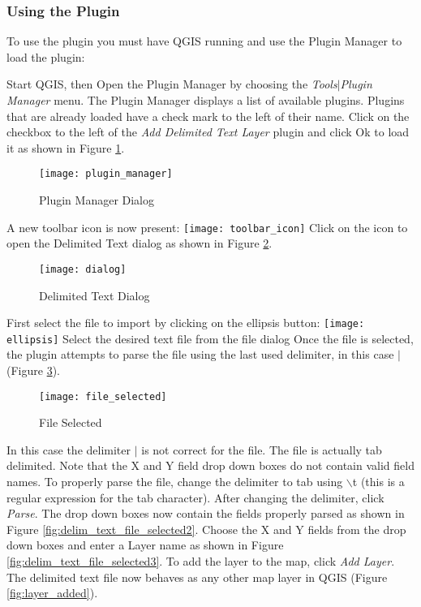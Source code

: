 \subsubsection{Using the Plugin}
To use the plugin you must have QGIS running and use the Plugin Manager to
load the plugin:

Start QGIS, then Open the Plugin Manager by choosing the {\em
Tools\mbox{$|$}Plugin Manager} menu. The Plugin Manager displays a list of
available plugins. Plugins that are already loaded have a check mark to the
left of their name. Click on the checkbox to the left of the {\em Add
Delimited Text Layer} plugin and click Ok to load it as shown in Figure
\ref{fig:plugin_manager}.

\begin{figure}[ht]
   \begin{center}
   \caption{Plugin Manager Dialog}
   \label{fig:plugin_manager}
   \smallskip
\texttt{[image: plugin\_manager]}
   \end{center}  
\end{figure}


A new toolbar icon is now present:
\texttt{[image: toolbar\_icon]}
Click on the icon to open the Delimited Text dialog as shown in Figure
\ref{fig:delim_text_plugin_dialog}.

\begin{figure}[ht]
   \begin{center}
   \caption{Delimited Text
Dialog}\label{fig:delim_text_plugin_dialog}\smallskip
\texttt{[image: dialog]}            
   \end{center}  
\end{figure}

  
First select the file to import by clicking on the ellipsis button: 
\texttt{[image: ellipsis]}
Select the desired text file from the file dialog
Once the file is selected, the plugin attempts to parse the file using the
last
used delimiter, in this case \mbox{$|$} (Figure
\ref{fig:delim_text_file_selected}).
\begin{figure}[ht]
   \begin{center}
   \caption{File Selected}\label{fig:delim_text_file_selected}\smallskip
\texttt{[image: file\_selected]}   
   \end{center}  
\end{figure}

In this case the delimiter \mbox{$|$} is not correct for the file. The file is
actually tab delimited. Note that the X and Y field drop down boxes do not
contain valid field names. To properly parse the file, change the delimiter to
tab using \mbox{$\backslash$}t (this is a regular expression for the tab
character). After changing the delimiter, click {\em Parse}.
The drop down boxes now contain the fields properly parsed as shown in Figure
\ref{fig:delim_text_file_selected2}. Choose the X and Y fields from the drop
down boxes and enter a Layer name as shown in Figure
\ref{fig:delim_text_file_selected3}. To add the layer to the
map, click {\em Add Layer}. The delimited text file now behaves as any other
map layer in QGIS (Figure \ref{fig:layer_added}).

